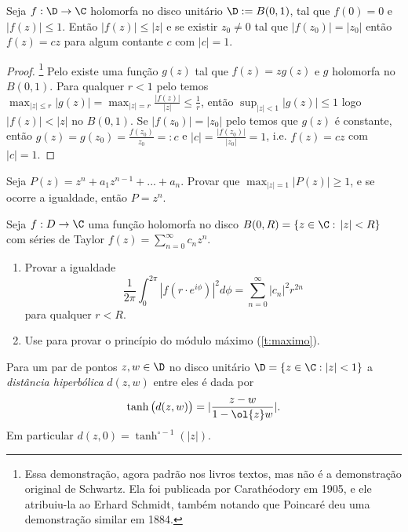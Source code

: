 \begin{lema}[Schwartz, 1869]
Seja $f : \D \to \C$ holomorfa no disco unitário $\D := B(0,1)$,
tal que $f(0) = 0$ e $|f(z)| \leq 1$. Então $|f(z)|\leq|z|$
e se existir $z_0\neq 0$ tal que $|f(z_0)| = |z_0|$ então $f(z) = c z$ para algum contante $c$ com
$|c|=1$.
\end{lema}
\begin{proof}\footnote{Essa demonstração, agora padrão nos livros textos,
mas não é a demonstração original de Schwartz.
Ela foi publicada por Carathéodory em 1905,
e ele atribuiu-la ao Erhard Schmidt, também notando que Poincaré deu
uma demonstração similar em 1884.}
Pelo  existe uma função $g(z)$ tal que $f(z) = z g(z)$ e $g$ holomorfa no $B(0,1)$.
Para qualquer $r<1$ pelo  temos
$\max_{|z|\leq r} |g(z)| = \max_{|z|=r} \frac{|f(z)|}{|z|} \leq \frac1{r}$,
então $\sup_{|z|<1} |g(z)|\leq 1$ logo $|f(z)|<|z|$ no $B(0,1)$.
Se $|f(z_0)| = |z_0|$ pelo  temos que $g(z)$ é constante,
então $g(z) = g(z_0) = \frac{f(z_0)}{z_0} =:c$ e $|c| = \frac{|f(z_0)|}{|z_0|} = 1$,
i.e. $f(z) = c z$ com $|c|=1$.
\end{proof}


\begin{problema}
Seja $P(z) = z^n + a_1 z^{n-1} + ... + a_n$.
Provar que $\max_{|z|=1} |P(z)| \geq 1$,
e se ocorre a igualdade, então $P = z^n$.
\end{problema}

\begin{problema}
\label{p:l2}
Seja $f : D \to \C$ uma função holomorfa no disco $B(0,R) = \{z\in\C:\, |z|<R \}$
com séries de Taylor $f(z) = \sum_{n=0}^\infty c_n z^n$.
\begin{enumerate}
\item Provar a igualdade
\begin{equation}
\label{eq:l2}
\frac{1}{2\pi} \int_0^{2\pi} |f(r\cdot e^{i\phi})|^2 d\phi = \sum_{n=0}^\infty |c_n|^2 r^{2n} 
\end{equation}
 para qualquer $r < R$.
\item Use  para provar o princípio do módulo máximo  (\cref{t:maximo}).
\end{enumerate}
\end{problema}

\begin{defin}
Para um par de pontos $z,w\in \D$ no disco unitário $\D = \{z\in\C: |z|<1\}$
a \emph{distância hiperbólica} $d(z,w)$ entre eles é dada por
\begin{equation}
\tanh\big(d(z,w)\big) = \lvert\frac{z-w}{1-\ol{z}w}\rvert.
\end{equation}
Em particular $d(z,0) = \tanh^{\circ-1}(|z|)$.
\end{defin}

